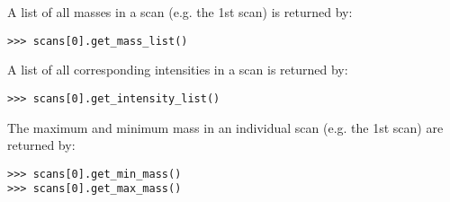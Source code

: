 A list of all masses in a scan (e.g. the 1st scan) is returned by:

\begin{verbatim}
>>> scans[0].get_mass_list()
\end{verbatim}

A list of all corresponding intensities in a scan is returned by:

\begin{verbatim}
>>> scans[0].get_intensity_list()
\end{verbatim}

The maximum and minimum mass in an individual scan (e.g. the 1st scan) are
returned by:

\begin{verbatim}
>>> scans[0].get_min_mass()
>>> scans[0].get_max_mass()
\end{verbatim}





